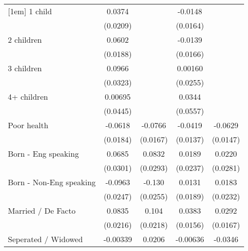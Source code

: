 {\begin{tabular}{l*{4}{c}}
[1em]
1 child             &      0.0374         &                     &     -0.0148         &                     \\
                    &    (0.0209)         &                     &    (0.0164)         &                     \\
[1em]
2 children          &      0.0602\sym{**} &                     &     -0.0139         &                     \\
                    &    (0.0188)         &                     &    (0.0166)         &                     \\
[1em]
3 children          &      0.0966\sym{**} &                     &     0.00160         &                     \\
                    &    (0.0323)         &                     &    (0.0255)         &                     \\
[1em]
4+ children         &     0.00695         &                     &      0.0344         &                     \\
                    &    (0.0445)         &                     &    (0.0557)         &                     \\
[1em]
Poor health         &     -0.0618\sym{***}&     -0.0766\sym{***}&     -0.0419\sym{**} &     -0.0629\sym{***}\\
                    &    (0.0184)         &    (0.0167)         &    (0.0137)         &    (0.0147)         \\
[1em]
Born - Eng speaking &      0.0685\sym{*}  &      0.0832\sym{**} &      0.0189         &      0.0220         \\
                    &    (0.0301)         &    (0.0293)         &    (0.0237)         &    (0.0281)         \\
[1em]
Born - Non-Eng speaking&     -0.0963\sym{***}&      -0.130\sym{***}&      0.0131         &      0.0183         \\
                    &    (0.0247)         &    (0.0255)         &    (0.0189)         &    (0.0232)         \\
[1em]
Married / De Facto  &      0.0835\sym{***}&       0.104\sym{***}&      0.0383\sym{*}  &      0.0292         \\
                    &    (0.0216)         &    (0.0218)         &    (0.0156)         &    (0.0167)         \\
[1em]
Seperated / Widowed &    -0.00339         &      0.0206         &    -0.00636         &     -0.0346         \\

\end{tabular}}

